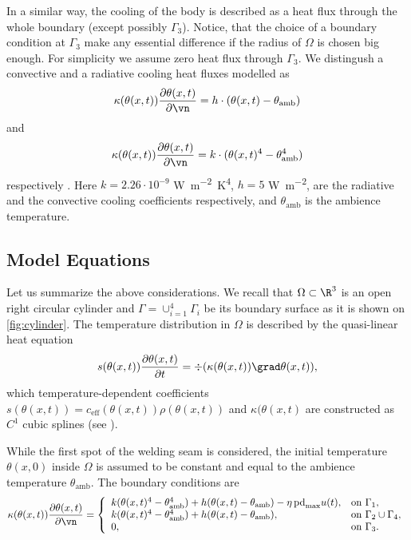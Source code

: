 In a similar way, the cooling of the body is described as a heat flux through the whole boundary (except possibly $\Gamma_3$). Notice, that the choice of a boundary condition at $\Gamma_3$ make any essential difference if the radius of $\Omega$ is chosen big enough.
For simplicity we assume zero heat flux through $\Gamma_3$.
We distingush a convective and a radiative cooling heat fluxes modelled as
\begin{equation}
	\kappa(\theta(x,t)) \frac{\partial \theta(x,t)}{\partial \vn} = h \cdot (\theta(x,t) - \theta_\text{amb})
\end{equation}
and
\begin{equation}
	\kappa(\theta(x,t)) \frac{\partial \theta(x,t)}{\partial \vn} = k \cdot (\theta(x,t)^4 - \theta^4_\text{amb})
\end{equation}
respectively .
Here $k = 2.26 \cdot 10^{-9}$ \si{\W\per\m^2\K^4}, $h = 5$ \si{\W\per\m^2}, are the radiative and the convective cooling coefficients respectively, and $\theta_\text{amb}$ is the ambience temperature.

\subsection{Model Equations}
\label{subsec:equations}

Let us summarize the above considerations.
We recall that $\Omega\subset \R^3$ is an open right circular cylinder and $\Gamma = \cup_{i=1}^4 \Gamma_i$ be its boundary surface as it is shown on \cref{fig:cylinder}. The temperature distribution in $\Omega$ is described by the quasi-linear heat equation
\begin{equation} \label{eq:heat_eq}
	s(\theta(x,t)) \frac{\partial \theta(x,t)}{\partial t} = \div (\kappa(\theta(x,t)) \grad\theta(x,t)),
\end{equation}
which temperature-dependent coefficients $s(\theta(x,t)) = c_\text{eff}(\theta(x,t)) \rho(\theta(x,t))$ and $\kappa(\theta(x,t)$ are constructed as $C^1$ cubic splines (see \cite[\texttt{optipuls.coefficients}]{optipuls_github}).

While the first spot of the welding seam is considered, the initial temperature $\theta(x,0)$ inside $\Omega$ is assumed to be constant and equal to the ambience temperature $\theta_\text{amb}$.
The boundary conditions are
\begin{equation} \label{eq:heat_eq_bc}
	\kappa(\theta(x,t)) \frac{\partial \theta(x,t)}{\partial \vn} = \left\{
		\begin{array}{ll}
			k (\theta(x,t)^4 - \theta_\text{amb}^4) + h (\theta(x,t) - \theta_\text{amb}) - \eta\, \text{pd}_{\max} u(t), & \text{on}\ \Gamma_1, \\
			k (\theta(x,t)^4 - \theta_\text{amb}^4) + h (\theta(x,t) - \theta_\text{amb}), & \text{on}\ \Gamma_2 \cup \Gamma_4, \\
			0, & \text{on}\ \Gamma_3.
		\end{array} \right.
\end{equation}


